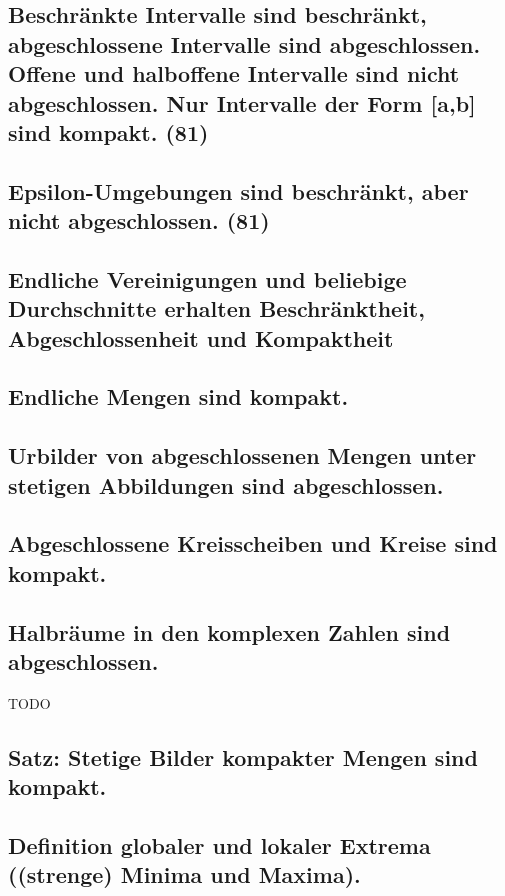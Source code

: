 \subsection{Beschränkte Intervalle sind beschränkt, abgeschlossene Intervalle sind abgeschlossen. Offene und halboffene Intervalle sind nicht abgeschlossen. Nur Intervalle der Form [a,b] sind kompakt. (81)}

\subsection{Epsilon-Umgebungen sind beschränkt, aber nicht abgeschlossen. (81)}

\subsection{Endliche Vereinigungen und beliebige Durchschnitte erhalten Beschränktheit, Abgeschlossenheit und Kompaktheit}

\subsection{Endliche Mengen sind kompakt.}

\subsection{Urbilder von abgeschlossenen Mengen unter stetigen Abbildungen sind abgeschlossen.}

\subsection{Abgeschlossene Kreisscheiben und Kreise sind kompakt.}

\subsection{Halbräume in den komplexen Zahlen sind abgeschlossen.}

TODO

\subsection{Satz: Stetige Bilder kompakter Mengen sind kompakt.}

\subsection{Definition globaler und lokaler Extrema ((strenge) Minima und Maxima).}

